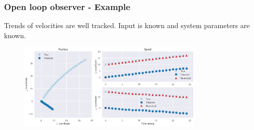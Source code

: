 \begin{frame}
	\frametitle{Open loop observer - Example}
	Trends of velocities are well tracked. Input is known and system parameters are known.
	 \begin{figure}[b]
	 	\includegraphics[width=0.8\textwidth]{fig/observer_ex_0}
	 	\caption*{}
	 \end{figure}
 	 
\end{frame}

